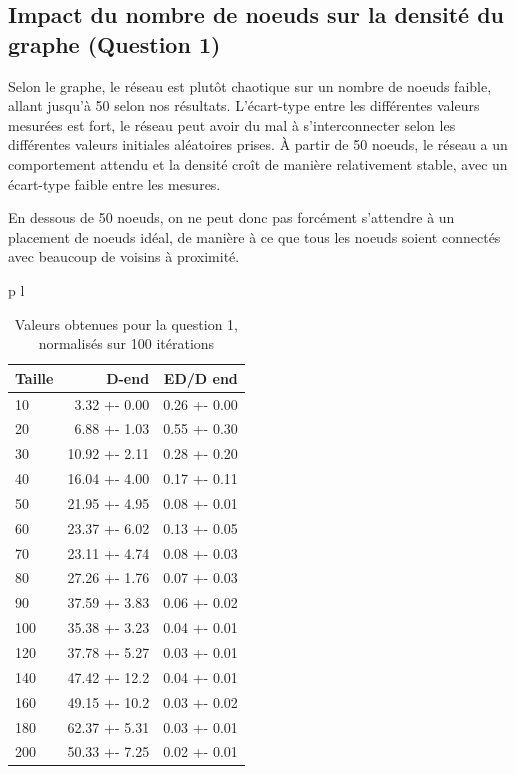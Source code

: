 \documentclass[a4paper]{article}
\begin{document}
\subsection{Impact du nombre de noeuds sur la densité du
  graphe (Question 1)}
\begin{minipage}{0.6\textwidth}
  Selon le graphe, le réseau est plutôt chaotique sur un nombre de
  noeuds faible, allant jusqu'à 50 selon nos résultats. L'écart-type
  entre les différentes valeurs mesurées est fort, le réseau peut
  avoir du mal à s'interconnecter selon les différentes valeurs
  initiales aléatoires prises. À partir de 50 noeuds, le réseau a un
  comportement attendu et la densité croît de manière relativement
  stable, avec un écart-type faible entre les mesures.

  En dessous de 50 noeuds, on ne peut donc pas forcément s'attendre à
  un placement de noeuds idéal, de manière à ce que tous les noeuds
  soient connectés avec beaucoup de voisins à proximité.
  \vfill
\end{minipage}%
\hfill
\begin{minipage}{0.35\textwidth}
\begin{tabular}{p{\textwidth} l}
\begin{table}[H]
  \centering
  \begin{tabular}{|l|r|r|}
    \hline
    Taille & D-end & ED/D end \\ \hline
    10  &  3.32 +- 0.00 & 0.26 +- 0.00 \\ \hline
     20  &  6.88 +- 1.03 & 0.55 +- 0.30 \\ \hline
     30  & 10.92 +- 2.11 & 0.28 +- 0.20 \\ \hline
     40  & 16.04 +- 4.00 & 0.17 +- 0.11 \\ \hline
     50  & 21.95 +- 4.95 & 0.08 +- 0.01 \\ \hline
     60  & 23.37 +- 6.02 & 0.13 +- 0.05 \\ \hline
     70  & 23.11 +- 4.74 & 0.08 +- 0.03 \\ \hline
     80  & 27.26 +- 1.76 & 0.07 +- 0.03 \\ \hline
     90  & 37.59 +- 3.83 & 0.06 +- 0.02 \\ \hline
     100 & 35.38 +- 3.23 & 0.04 +- 0.01 \\ \hline
     120 & 37.78 +- 5.27 & 0.03 +- 0.01 \\ \hline
     140 & 47.42 +- 12.2 & 0.04 +- 0.01 \\ \hline
     160 & 49.15 +- 10.2 & 0.03 +- 0.02 \\ \hline
     180 & 62.37 +- 5.31 & 0.03 +- 0.01 \\ \hline
     200 & 50.33 +- 7.25 & 0.02 +- 0.01 \\ \hline
  \end{tabular}
  \caption{Valeurs obtenues pour la question 1, normalisés sur 100 itérations}
\end{table}
\end{tabular}
\end{minipage}
\end{document}
